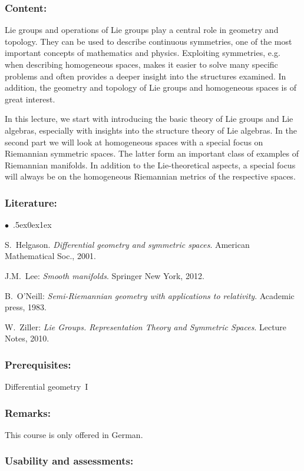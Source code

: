 \documentclass[a4paper,10pt]{article}
\renewenvironment{itemize}{\begin{list}{$\bullet$\ }{\itemsep.5ex\setlength{\topsep}{0.5\itemsep}\parsep0ex\labelsep1ex\settowidth{\labelwidth}{$\bullet$\ }\setlength{\leftmargin}{\labelwidth}\addtolength{\leftmargin}{3ex}\addtolength{\leftmargin}{\labelsep}}}{\end{list}}
\begin{document}
\subsubsection*{\large
    Content:
}
Lie groups and operations of Lie groups play a central role in geometry and topology. They can be used to describe continuous symmetries, one of the most important concepts of mathematics and physics. Exploiting symmetries, e.g. when describing homogeneous spaces, makes it easier to solve many specific problems and often provides a deeper insight into the structures examined. In addition, the geometry and topology of Lie groups and homogeneous spaces is of great interest.

 In this lecture, we start with introducing the basic theory of Lie groups and Lie algebras, especially with insights into the structure theory of Lie algebras. In the second part we will look at homogeneous spaces with a special focus on Riemannian symmetric spaces. The latter form an important class of examples of Riemannian manifolds. In addition to the Lie-theoretical aspects, a special focus will always be on the homogeneous Riemannian metrics of the respective spaces.
\subsubsection*{\large
    Literature:
}
\begin{itemize}
\item
S.~Helgason. \emph{Differential geometry and symmetric spaces}. American Mathematical Soc., 2001.
\item
J.M.~Lee: \emph{Smooth manifolds}. Springer New York, 2012.
\item
B.~O'Neill: \emph{Semi-Riemannian geometry with applications to relativity}. Academic press, 1983.
\item
W.~Ziller: \emph{Lie Groups. Representation Theory and Symmetric Spaces}. Lecture Notes, 2010.
\end{itemize}

\subsubsection*{\large
    Prerequisites:
}
Differential geometry~I
\subsubsection*{\large
    Remarks:
}
This course is only offered in German.
\subsubsection*{\large
    Usability and assessments:
}
\end{document}
